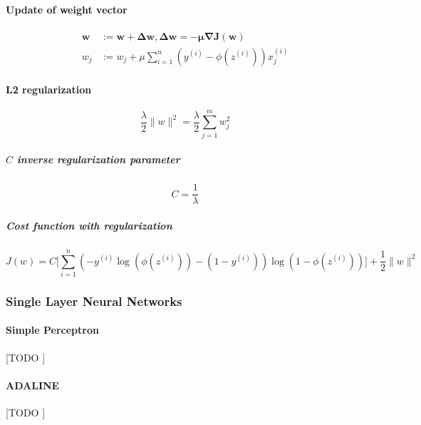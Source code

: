 \documentclass{article}
\begin{document}
			\paragraph{Update of weight vector}
			
			\begin{equation}
				\begin{aligned}
					\boldsymbol{w} & \boldsymbol{:= w + \Delta w, \Delta w = - \mu \nabla J(w)} \\
					w_j & := w_j + \mu \sum_{i=1}^n (y^{(i)} - \phi(z^{(i)}))x_j^{(i)}
				\end{aligned}
			\end{equation}
			
			\paragraph{L2 regularization}
			
			\begin{equation}
				\frac{\lambda}{2} \| w\|^2 = \frac{\lambda}{2} \sum_{j=1}^m w_j^2
			\end{equation}
			
			\subparagraph{$C$ inverse regularization parameter}
			
			\begin{equation}
				C = \frac{1}{\lambda}
			\end{equation}
			
			\subparagraph{Cost function with regularization}
			\begin{equation}
				J(w) = C \bigg[ \sum_{i=1}^n (-y^{(i)}\log(\phi(z^{(i)}))-(1-y^{(i)}))\log(1-\phi(z^{(i)})) \bigg] + \frac{1}{2} \|w\|^2
			\end{equation}


			\subsubsection{Single Layer Neural Networks}
			\label{sec:single-layer-nn}


				\paragraph{Simple Perceptron}
				\label{sec:perceptron}
				[TODO ]

				\paragraph{ADALINE}
				\label{sec:adaline}
				[TODO ]
\end{document}
